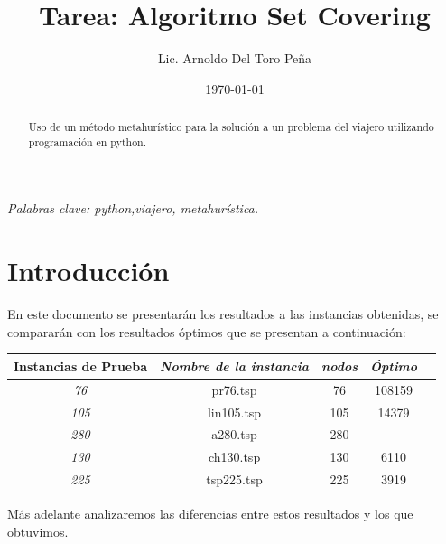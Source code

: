\documentclass[12pt,a4paper]{article}
\author{Lic. Arnoldo Del Toro Peña}
\title{Tarea: Algoritmo Set Covering}
\date{\today}
\begin{document}
\maketitle



\thispagestyle{empty}
\begin{abstract}
    Uso de un método metahurístico para la solución a un problema del viajero utilizando programación en python.
\end{abstract}
{\centering \textit{Palabras clave: python,viajero, metahurística.}}
\section{Introducción}
En este documento se presentarán los resultados a las instancias obtenidas, se compararán con los resultados óptimos que se presentan a continuación:

\begin{table}[h!]
\centering
\begin{tabular}{|c|c|c|c|c|}
\hline
\multicolumn{1}{|l|}{\textbf{Instancias de Prueba}} & \multicolumn{1}{l|}{\textit{Nombre de la instancia}}  & \multicolumn{1}{c|}{\textit{nodos}} & \textit{Óptimo} \\ \hline
\textit{76}                                          &  pr76.tsp                                & 76                            & 108159            \\ \hline
\textit{105}                                          & lin105.tsp                                 & 105                            & 14379             \\ \hline
\textit{280}                                          & a280.tsp                                 & 280                           & -            \\ \hline
\textit{130}                                          & ch130.tsp                                 & 130                            & 6110             \\ \hline
\textit{225}                                          & tsp225.tsp                                 & 225                            & 3919             \\ \hline

\end{tabular}
\end{table}

Más adelante analizaremos las diferencias entre estos resultados y los que obtuvimos.
\end{document}
